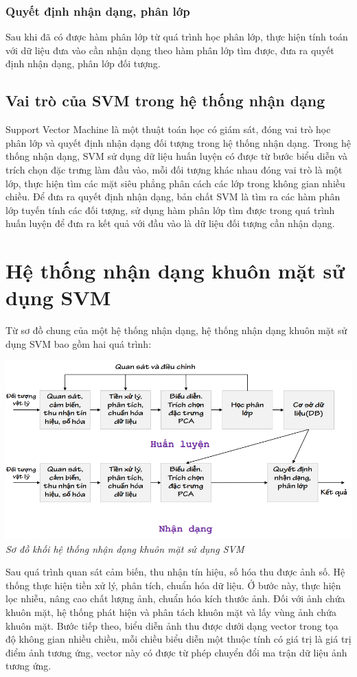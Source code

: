 \documentclass[12pt,a4paper]{article}
\begin{document}
\subsubsection{Quyết định nhận dạng, phân lớp}
Sau khi đã có được hàm phân lớp từ quá trình học phân lớp, thực hiện tính toán với dữ liệu đưa vào cần nhận dạng theo hàm phân lớp tìm được, đưa ra quyết định nhận dạng, phân lớp đối tượng. 

\subsection{Vai trò của SVM trong hệ thống nhận dạng}
Support Vector Machine là một thuật toán học có giám sát, đóng vai trò học phân lớp và quyết định nhận dạng đối tượng trong hệ thống nhận dạng. Trong hệ thống nhận dạng, SVM sử dụng dữ liệu huấn luyện có được từ bước biểu diễn và trích chọn đặc trưng làm đầu vào, mỗi đối tượng khác nhau đóng vai trò là một lớp, thực hiện tìm các mặt siêu phẳng phân cách các lớp trong không gian nhiều chiều. Để đưa ra quyết định nhận dạng, bản chất SVM là tìm ra các hàm phân lớp tuyến tính các đối tượng, sử dụng hàm phân lớp tìm được trong quá trình huấn luyện để đưa ra kết quả với đầu vào là dữ liệu đối tượng cần nhận dạng. 
\section{Hệ thống nhận dạng khuôn mặt sử dụng SVM}
Từ sơ đồ chung của một hệ thống nhận dạng, hệ thống nhận dạng khuôn mặt sử dụng SVM bao gồm hai quá trình:
\begin{center}
\includegraphics[scale=0.6]{25.png}\\
\textit{Sơ đồ khối hệ thống nhận dạng khuôn mặt sử dụng SVM}
\end{center}  
\par 
Sau quá trình quan sát cảm biến, thu nhận tín hiệu, số hóa thu được ảnh số. Hệ thống thực hiện tiền xử lý, phân tích, chuẩn hóa dữ liệu. Ở bước này, thực hiện lọc nhiễu, nâng cao chất lượng ảnh, chuẩn hóa kích thước ảnh. Đối với ảnh chứa khuôn mặt, hệ thống phát hiện và phân tách khuôn mặt và lấy vùng ảnh chứa khuôn mặt. Bước tiếp theo, biểu diễn ảnh thu được dưới dạng vector trong tọa độ không gian nhiều chiều, mỗi chiều biểu diễn một thuộc tính có giá trị là giá trị điểm ảnh tương ứng, vector này có được từ phép chuyển đổi ma trận dữ liệu ảnh tương ứng. \par    
\end{document}
